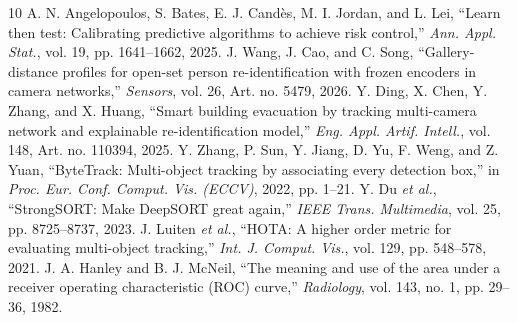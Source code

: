\documentclass[journal]{IEEEtran}
\begin{document}
\begin{thebibliography}{10}
 A. N. Angelopoulos, S. Bates, E. J. Cand\`es, M. I. Jordan, and L. Lei, ``Learn then test: Calibrating predictive algorithms to achieve risk control,'' \emph{Ann. Appl. Stat.}, vol. 19, pp. 1641--1662, 2025.
 J. Wang, J. Cao, and C. Song, ``Gallery-distance profiles for open-set person re-identification with frozen encoders in camera networks,'' \emph{Sensors}, vol. 26, Art. no. 5479, 2026.
 Y. Ding, X. Chen, Y. Zhang, and X. Huang, ``Smart building evacuation by tracking multi-camera network and explainable re-identification model,'' \emph{Eng. Appl. Artif. Intell.}, vol. 148, Art. no. 110394, 2025.
 Y. Zhang, P. Sun, Y. Jiang, D. Yu, F. Weng, and Z. Yuan, ``ByteTrack: Multi-object tracking by associating every detection box,'' in \emph{Proc. Eur. Conf. Comput. Vis. (ECCV)}, 2022, pp. 1--21.
 Y. Du \emph{et al.}, ``StrongSORT: Make DeepSORT great again,'' \emph{IEEE Trans. Multimedia}, vol. 25, pp. 8725--8737, 2023.
 J. Luiten \emph{et al.}, ``HOTA: A higher order metric for evaluating multi-object tracking,'' \emph{Int. J. Comput. Vis.}, vol. 129, pp. 548--578, 2021.
 J. A. Hanley and B. J. McNeil, ``The meaning and use of the area under a receiver operating characteristic (ROC) curve,'' \emph{Radiology}, vol. 143, no. 1, pp. 29--36, 1982.
\end{thebibliography}
\end{document}
